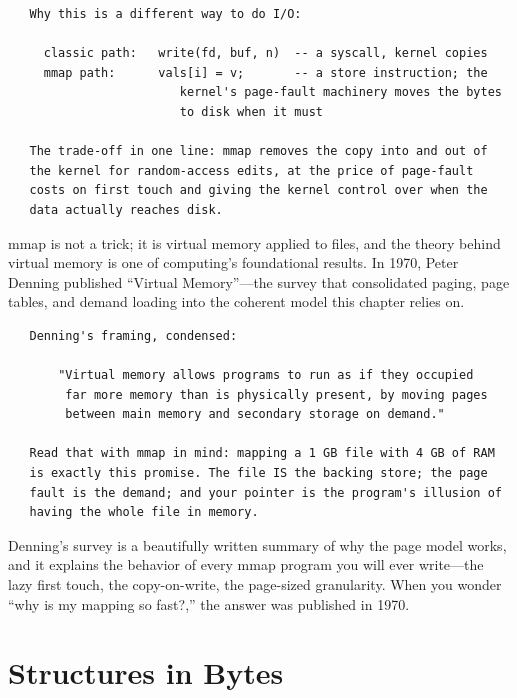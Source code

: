 \begin{verbatim}
   Why this is a different way to do I/O:

     classic path:   write(fd, buf, n)  -- a syscall, kernel copies
     mmap path:      vals[i] = v;       -- a store instruction; the
                        kernel's page-fault machinery moves the bytes
                        to disk when it must

   The trade-off in one line: mmap removes the copy into and out of
   the kernel for random-access edits, at the price of page-fault
   costs on first touch and giving the kernel control over when the
   data actually reaches disk.
\end{verbatim}

\begin{researchnote}
mmap is not a trick; it is virtual memory applied to files, and the
theory behind virtual memory is one of computing's foundational
results. In 1970, Peter Denning published ``Virtual Memory''---the
survey that consolidated paging, page tables, and demand loading into
the coherent model this chapter relies on.

\begin{verbatim}
   Denning's framing, condensed:

       "Virtual memory allows programs to run as if they occupied
        far more memory than is physically present, by moving pages
        between main memory and secondary storage on demand."

   Read that with mmap in mind: mapping a 1 GB file with 4 GB of RAM
   is exactly this promise. The file IS the backing store; the page
   fault is the demand; and your pointer is the program's illusion of
   having the whole file in memory.
\end{verbatim}

Denning's survey is a beautifully written summary of why the page
model works, and it explains the behavior of every mmap program you
will ever write---the lazy first touch, the copy-on-write, the
page-sized granularity. When you wonder ``why is my mapping so
fast?,'' the answer was published in 1970.

\end{researchnote}

\section{Structures in Bytes}

